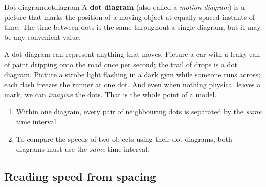 \documentclass[11pt,twoside,openany]{book}
\begin{document}
\begin{definition}{Dot diagram}{dotdiagram}
A \textbf{dot diagram} (also called a \emph{motion diagram}) is a picture that marks the position of a moving object at equally spaced instants of time. The time between dots is the same throughout a single diagram, but it may be any convenient value.
\end{definition}

A dot diagram can represent anything that moves. Picture a car with a leaky can of paint dripping onto the road once per second; the trail of drops is a dot diagram. Picture a strobe light flashing in a dark gym while someone runs across; each flash freezes the runner at one dot. And even when nothing physical leaves a mark, we can \emph{imagine} the dots. That is the whole point of a model.

\begin{keyidea}
\begin{enumerate}[itemsep=2pt]
  \item Within one diagram, every pair of neighbouring dots is separated by the \emph{same} time interval.
  \item To compare the speeds of two objects using their dot diagrams, both diagrams must use the \emph{same} time interval.
\end{enumerate}
\end{keyidea}

\subsection{Reading speed from spacing}
\end{document}
